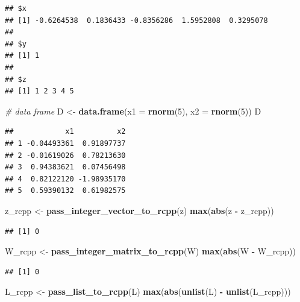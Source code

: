 \documentclass[]{book}
\newenvironment{Shaded}{\begin{snugshade}}{\end{snugshade}}
\newcommand{\KeywordTok}[1]{\textcolor[rgb]{0.13,0.29,0.53}{\textbf{#1}}}
\newcommand{\DataTypeTok}[1]{\textcolor[rgb]{0.13,0.29,0.53}{#1}}
\newcommand{\DecValTok}[1]{\textcolor[rgb]{0.00,0.00,0.81}{#1}}
\newcommand{\StringTok}[1]{\textcolor[rgb]{0.31,0.60,0.02}{#1}}
\newcommand{\CommentTok}[1]{\textcolor[rgb]{0.56,0.35,0.01}{\textit{#1}}}
\newcommand{\OperatorTok}[1]{\textcolor[rgb]{0.81,0.36,0.00}{\textbf{#1}}}
\newcommand{\NormalTok}[1]{#1}
\begin{document}
\begin{verbatim}
## $x
## [1] -0.6264538  0.1836433 -0.8356286  1.5952808  0.3295078
## 
## $y
## [1] 1
## 
## $z
## [1] 1 2 3 4 5
\end{verbatim}

\begin{Shaded}
\begin{Highlighting}[]
\CommentTok{# data frame}
\NormalTok{D <-}\StringTok{ }\KeywordTok{data.frame}\NormalTok{(}\DataTypeTok{x1 =} \KeywordTok{rnorm}\NormalTok{(}\DecValTok{5}\NormalTok{), }\DataTypeTok{x2 =} \KeywordTok{rnorm}\NormalTok{(}\DecValTok{5}\NormalTok{))}
\NormalTok{D}
\end{Highlighting}
\end{Shaded}

\begin{verbatim}
##            x1          x2
## 1 -0.04493361  0.91897737
## 2 -0.01619026  0.78213630
## 3  0.94383621  0.07456498
## 4  0.82122120 -1.98935170
## 5  0.59390132  0.61982575
\end{verbatim}

\begin{Shaded}
\begin{Highlighting}[]
\NormalTok{z_rcpp <-}\StringTok{ }\KeywordTok{pass_integer_vector_to_rcpp}\NormalTok{(z)}
\KeywordTok{max}\NormalTok{(}\KeywordTok{abs}\NormalTok{(z }\OperatorTok{-}\StringTok{ }\NormalTok{z_rcpp))}
\end{Highlighting}
\end{Shaded}

\begin{verbatim}
## [1] 0
\end{verbatim}

\begin{Shaded}
\begin{Highlighting}[]
\NormalTok{W_rcpp <-}\StringTok{ }\KeywordTok{pass_integer_matrix_to_rcpp}\NormalTok{(W)}
\KeywordTok{max}\NormalTok{(}\KeywordTok{abs}\NormalTok{(W }\OperatorTok{-}\StringTok{ }\NormalTok{W_rcpp))}
\end{Highlighting}
\end{Shaded}

\begin{verbatim}
## [1] 0
\end{verbatim}

\begin{Shaded}
\begin{Highlighting}[]
\NormalTok{L_rcpp <-}\StringTok{ }\KeywordTok{pass_list_to_rcpp}\NormalTok{(L)}
\KeywordTok{max}\NormalTok{(}\KeywordTok{abs}\NormalTok{(}\KeywordTok{unlist}\NormalTok{(L) }\OperatorTok{-}\StringTok{ }\KeywordTok{unlist}\NormalTok{(L_rcpp)))}
\end{Highlighting}
\end{Shaded}
\end{document}
